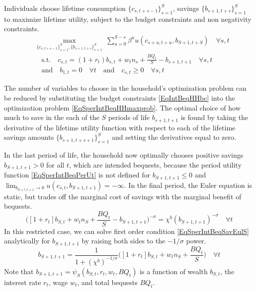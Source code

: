 \documentclass[letterpaper,12pt]{article}
\theoremstyle{definition}
\numberwithin{equation}{section}
\numberwithin{exercise}{section}
\begin{document}
\begin{spacing}{1.5}
      Individuals choose lifetime consumption $\{c_{s,t+s-1}\}_{s=1}^S$, savings $\{b_{s+1,t+s}\}_{s=1}^{S}$ to maximize lifetime utility, subject to the budget constraints and non negativity constraints.
      \begin{equation}\label{EqSperIntBeqHHmaxprob}
         \begin{split}
            &\max_{\{c_{s,t+s-1}\}_{s=1}^S,\{b_{s+1,t+s}\}_{s=1}^{S}}\:\sum_{u=0}^{S-s}\beta^u u(c_{s+u,t+u},b_{S+1,t+S}) \quad\forall s,t \\
            &\quad\text{s.t.}\quad c_{s,t} = (1 + r_t)b_{s,t} + w_{t}n_s + \frac{BQ_t}{S} - b_{s+1,t+1} \quad\forall s,t \\
            &\quad\text{and}\quad b_{1,t}=0 \quad\forall t \quad\text{and}\quad c_{s,t}\geq 0 \quad\forall s,t
         \end{split}
      \end{equation}

      The number of variables to choose in the household's optimization problem can be reduced by substituting the budget constraints \eqref{EqIntBeqHHbc} into the optimization problem \eqref{EqSperIntBeqHHmaxprob}. The optimal choice of how much to save in the each of the $S$ periods of life $b_{s+1,t+1}$ is found by taking the derivative of the lifetime utility function with respect to each of the lifetime savings amounts $\{b_{s+1,t+s+1}\}_{s=1}^{S}$ and setting the derivatives equal to zero.

      In the last period of life, the household now optimally chooses positive savings $b_{S+1,t+1}>0$ for all $t$, which are intended bequests, because the period utility function \eqref{EqSperIntBeqPerUt} is not defined for $b_{S+1,t+1}\leq 0$ and $\lim_{b_{S+!,t+1}\rightarrow 0}u(c_{s,t},b_{S+1,t+1}) = -\infty$. In the final period, the Euler equation is static, but trades off the marginal cost of savings with the marginal benefit of bequests.
      \begin{equation}\label{EqSperIntBeqSavEulS}
         \biggl([1+r_t]b_{S,t} + w_t n_S + \frac{BQ_t}{S} - b_{S+1,t+1}\biggr)^{-\sigma} = \chi^b\left(b_{S+1,t+1}\right)^{-\sigma} \quad\forall t
      \end{equation}
      In this restricted case, we can solve first order condition \eqref{EqSperIntBeqSavEulS} analytically for $b_{S+1,t+1}$ by raising both sides to the $-1/\sigma$ power.
      \begin{equation}\label{EqSperIntBeqSavS}
         b_{S+1,t+1} = \frac{1}{1+(\chi^b)^{-1/\sigma}}\biggl([1+r_t]b_{S,t} + w_t n_S + \frac{BQ_t}{S}\biggr) \quad\forall t
      \end{equation}
      Note that $b_{S+1,t+1}=\psi_S\left(b_{S,t},r_t,w_t,BQ_t\right)$ is a function of wealth $b_{S,t}$, the interest rate $r_t$, wage $w_t$, and total bequests $BQ_t$.


\end{spacing}
\end{document}
